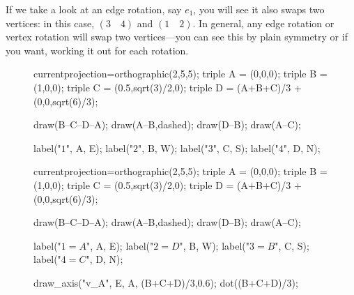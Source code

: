 \documentclass[../gatm_answers.tex]{subfiles}
\begin{document}
If we take a look at an edge rotation, say $e_1$, you will see it also swaps two vertices: in this case, $(3\quad 4)$ and $(1\quad 2)$. In general, any edge rotation or vertex rotation will swap two vertices---you can see this by plain symmetry or if you want, working it out for each rotation.

\begin{figure}[h]
	\begin{center}
		\begin{minipage}[b]{0.45\textwidth}
			\centering
			\begin{asy}[width=0.5\textwidth]
			currentprojection=orthographic(2,5,5);
			triple A = (0,0,0);
			triple B = (1,0,0);
			triple C = (0.5,sqrt(3)/2,0);
			triple D = (A+B+C)/3 + (0,0,sqrt(6)/3);
			
			draw(B--C--D--A);
			draw(A--B,dashed);
			draw(D--B);
			draw(A--C);
			
			label("$1$", A, E);
			label("$2$", B, W);
			label("$3$", C, S);
			label("$4$", D, N);
			
			\end{asy}
		\end{minipage}
		\hfill
		\begin{minipage}[b]{0.45\textwidth}
			\begin{asy}[width=0.7\textwidth]
			currentprojection=orthographic(2,5,5);
			triple A = (0,0,0);
			triple B = (1,0,0);
			triple C = (0.5,sqrt(3)/2,0);
			triple D = (A+B+C)/3 + (0,0,sqrt(6)/3);
			
			draw(B--C--D--A);
			draw(A--B,dashed);
			draw(D--B);
			draw(A--C);
			
			label("$1=A$", A, E);
			label("$2=D$", B, W);
			label("$3=B$", C, S);
			label("$4=C$", D, N);
			
			draw_axis("v_A", E, A, (B+C+D)/3,0.6);
			dot((B+C+D)/3);
			\end{asy}
		\end{minipage}
	\end{center}
	\vspace*{-2\baselineskip}
	\begin{center}
		\begin{minipage}[t]{0.45\textwidth}
			\label{fig:tetra_indices}
		\end{minipage}
		\hfill
		\begin{minipage}[t]{0.45\textwidth}
			\label{fig:v_a_repr}
		\end{minipage}
	\end{center}
	\vspace*{-2\baselineskip}
\end{figure}
\end{document}
